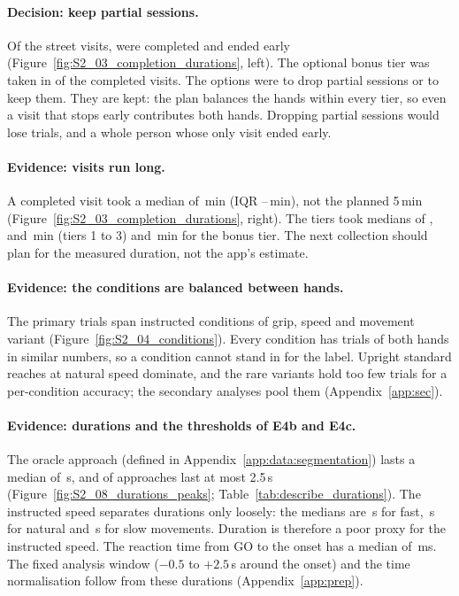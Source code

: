 \paragraph{Decision: keep partial sessions.} Of the  street visits,
 were completed and  ended early
(Figure~\ref{fig:S2_03_completion_durations}, left). The optional bonus tier was taken in
 of the completed visits. The options were to drop partial sessions or to
keep them. They are kept: the plan balances the hands within every tier, so even a visit that stops early
contributes both hands. Dropping partial sessions would lose trials, and a whole person whose only visit
ended early.

\paragraph{Evidence: visits run long.} A completed visit took a median of \,min
(IQR --\,min), not the planned 5\,min
(Figure~\ref{fig:S2_03_completion_durations}, right). The tiers took medians of
,  and \,min
(tiers 1 to 3) and \,min for the bonus tier. The next collection should plan
for the measured duration, not the app's estimate.

\paragraph{Evidence: the conditions are balanced between hands.} The primary trials span
 instructed conditions of grip, speed and movement variant
(Figure~\ref{fig:S2_04_conditions}). Every condition has trials of both hands in similar numbers, so a
condition cannot stand in for the label. Upright standard reaches at natural speed dominate, and the rare
variants hold too few trials for a per-condition accuracy; the secondary analyses pool them
(Appendix~\ref{app:sec}).

\paragraph{Evidence: durations and the thresholds of E4b and E4c.} The oracle approach (defined in
Appendix~\ref{app:data:segmentation}) lasts a median of \,s, and
 of approaches last at most 2.5\,s (Figure~\ref{fig:S2_08_durations_peaks};
Table~\ref{tab:describe_durations}). The instructed speed separates durations only loosely: the medians are
\,s for fast, \,s for natural and
\,s for slow movements. Duration is therefore a poor proxy for the instructed speed. The reaction time from GO to the onset has a median of \,ms.
The fixed analysis window ($-0.5$ to $+2.5$\,s around the onset) and the time normalisation follow from these
durations (Appendix~\ref{app:prep}).

